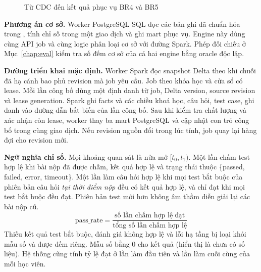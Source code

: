 \begin{figure}[H]
\centering
{}
\caption{Từ CDC đến kết quả phục vụ BR4 và BR5}
\label{fig:br45}
\end{figure}

\textbf{Phương án cơ sở.} Worker PostgreSQL SQL đọc các bản ghi đã chuẩn hóa trong , tính chỉ số trong một giao dịch và ghi mart phục vụ. Engine này dùng cùng API job và cùng logic phân loại cơ sở với đường Spark. Phép đối chiếu ở Mục~\ref{chap:eval} kiểm tra số đếm cơ sở của cả hai engine bằng oracle độc lập.

\textbf{Đường triển khai mặc định.} Worker Spark đọc snapshot Delta theo  khi chuỗi đã hạ cánh bao phủ revision mà job yêu cầu. Job theo khóa học và cửa sổ có lease. Mỗi lần công bố dùng một định danh từ job, Delta version, source revision và lease generation. Spark ghi facts và các chiều khoá học, câu hỏi, test case, ghi danh vào đường dẫn bất biến của lần công bố. Sau khi kiểm tra chất lượng và xác nhận còn lease, worker thay ba mart PostgreSQL và cập nhật con trỏ công bố trong cùng giao dịch. Nếu revision nguồn đổi trong lúc tính, job quay lại hàng đợi cho revision mới.

\textbf{Ngữ nghĩa chỉ số.} Mọi khoảng quan sát là nửa mở $[t_0, t_1)$. Một lần chấm test hợp lệ khi bài nộp đã được chấm, kết quả hợp lệ và trạng thái thuộc \{passed, failed, error, timeout\}. Một lần làm câu hỏi hợp lệ khi mọi test bắt buộc của phiên bản câu hỏi \emph{tại thời điểm nộp} đều có kết quả hợp lệ, và chỉ đạt khi mọi test bắt buộc đều đạt. Phiên bản test mới hơn không âm thầm diễn giải lại các bài nộp cũ.
\[
  \text{pass\_rate} = \frac{\text{số lần chấm hợp lệ đạt}}{\text{tổng số lần chấm hợp lệ}}
\]
Thiếu kết quả test bắt buộc, đánh giá không hợp lệ và lỗi hạ tầng bị loại khỏi mẫu số và được đếm riêng. Mẫu số bằng 0 cho kết quả  (hiển thị là chưa có số liệu). Hệ thống cũng tính tỷ lệ đạt ở lần làm đầu tiên và lần làm cuối cùng của mỗi học viên.

